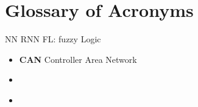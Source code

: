 \chapter*{Glossary of Acronyms}

NN
RNN
FL: fuzzy Logic
\begin{itemize}
    \item \textbf{CAN} Controller Area Network
    \item \textbf{} 

    \newpage
    \thispagestyle{acronyms}
    \item \textbf{} 

\end{itemize}

\newpage







